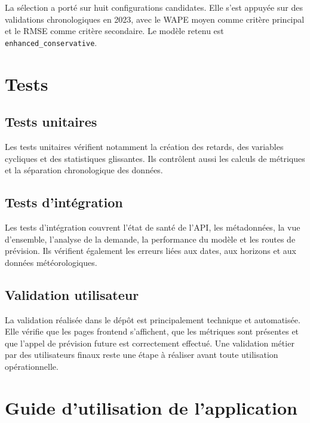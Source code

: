 \documentclass[12pt,a4paper]{report}
\begin{document}
La sélection a porté sur huit configurations candidates. Elle s'est appuyée
sur des validations chronologiques en 2023, avec le WAPE moyen comme critère
principal et le RMSE comme critère secondaire. Le modèle retenu est
\texttt{enhanced_conservative}.


\section{Tests}

\subsection{Tests unitaires}

Les tests unitaires vérifient notamment la création des retards, des variables
cycliques et des statistiques glissantes. Ils contrôlent aussi les calculs de
métriques et la séparation chronologique des données.

\subsection{Tests d'intégration}

Les tests d'intégration couvrent l'état de santé de l'API, les métadonnées,
la vue d'ensemble, l'analyse de la demande, la performance du modèle et les
routes de prévision. Ils vérifient également les erreurs liées aux dates, aux
horizons et aux données météorologiques.

\subsection{Validation utilisateur}

La validation réalisée dans le dépôt est principalement technique et
automatisée. Elle vérifie que les pages frontend s'affichent, que les
métriques sont présentes et que l'appel de prévision future est correctement
effectué. Une validation métier par des utilisateurs finaux reste une étape
à réaliser avant toute utilisation opérationnelle.

\section{Guide d'utilisation de l'application}
\end{document}

